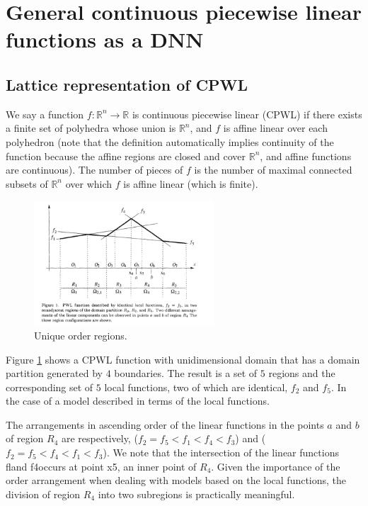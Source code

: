 \section{General continuous piecewise linear functions as a DNN}
\subsection{Lattice representation of CPWL}

We say a function $f:\mathbb{R}^n \to \mathbb{R}$ is continuous piecewise linear (CPWL) if there exists a finite set of polyhedra whose union is $\mathbb{R}^n$, and $f$ is affine linear over each polyhedron (note that the definition automatically implies continuity of the function because the affine regions are closed and cover $\mathbb{R}^n$, and affine functions are continuous). The number of pieces of $f$ is the number of maximal connected subsets of $\mathbb{R}^n$ over which $f$ is affine linear (which is finite).

\begin{figure}[!ht]
\centering
	\includegraphics[width=0.6\textwidth]{6DL/figures/latticePWL.png}   
	\caption{Unique order regions.} 
	\label{fig:latticePWL}
\end{figure}
Figure \ref{fig:latticePWL} shows a CPWL function with unidimensional domain that has a domain partition generated by $4$ boundaries. The result is a set of $5$ regions and the corresponding set of $5$ local functions, two of which are identical, $f_2$ and $f_5$. In the case of a model described in terms of the local functions. 

The arrangements in ascending order of the linear functions in the points $a$ and $b$ of region $R_4$ are respectively, ($f_2 = f_5 < f_1 < f_4 < f_3$) and ($f_2= f_5 < f_4 < f_1 < f_3$). We note that the intersection of the linear functions fland f4occurs at point x5, an inner point of $R_4$. Given the importance of the order arrangement when dealing with models based on the local functions, the division of region $R_4$ into two subregions is practically meaningful.

